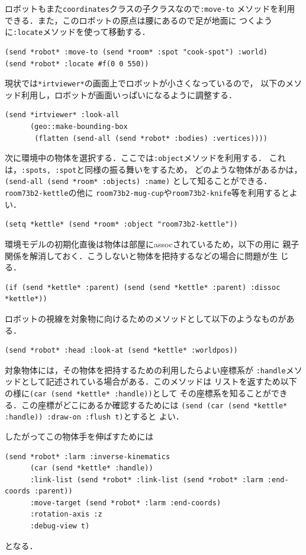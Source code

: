 ロボットもまた\verb|coordinates|クラスの子クラスなので\verb|:move-to|
メソッドを利用できる．また，このロボットの原点は腰にあるので足が地面に
つくように\verb|:locate|メソッドを使って移動する．
{\baselineskip=10pt
\begin{verbatim}
(send *robot* :move-to (send *room* :spot "cook-spot") :world)
(send *robot* :locate #f(0 0 550))
\end{verbatim}
}

現状では\verb|*irtviewer*|の画面上でロボットが小さくなっているので，
以下のメソッド利用し，ロボットが画面いっぱいになるように調整する．
{\baselineskip=10pt
\begin{verbatim}
(send *irtviewer* :look-all
      (geo::make-bounding-box
       (flatten (send-all (send *robot* :bodies) :vertices))))
\end{verbatim}
}

次に環境中の物体を選択する．ここでは\verb|:object|メソッドを利用する．
これは，\verb|:spots, :spot|と同様の振る舞いをするため，
どのような物体があるかは，\verb|(send-all (send *room* :objects) :name)|
として知ることができる．
\verb|room73b2-kettle|の他に
\verb|room73b2-mug-cup|や\verb|room73b2-knife|等を利用するとよい．

{\baselineskip=10pt
\begin{verbatim}
(setq *kettle* (send *room* :object "room73b2-kettle"))
\end{verbatim}
}

環境モデルの初期化直後は物体は部屋にassocされているため，以下の用に
親子関係を解消しておく．こうしないと物体を把持するなどの場合に問題が生
じる．
{\baselineskip=10pt
\begin{verbatim}
(if (send *kettle* :parent) (send (send *kettle* :parent) :dissoc *kettle*))
\end{verbatim}
}

ロボットの視線を対象物に向けるためのメソッドとして以下のようなものがあ
る．
{\baselineskip=10pt
\begin{verbatim}
(send *robot* :head :look-at (send *kettle* :worldpos))
\end{verbatim}
}

対象物体には，その物体を把持するための利用したらよい座標系が
\verb|:handle|メソッドとして記述されている場合がある．このメソッドは
リストを返すため以下の様に\verb|(car (send *kettle* :handle))|として
その座標系を知ることができる．この座標がどこにあるか確認するためには
\verb|(send (car (send *kettle* :handle)) :draw-on :flush t)|とすると
よい．

したがってこの物体手を伸ばすためには
{\baselineskip=10pt
\begin{verbatim}
(send *robot* :larm :inverse-kinematics
      (car (send *kettle* :handle))
      :link-list (send *robot* :link-list (send *robot* :larm :end-coords :parent))
      :move-target (send *robot* :larm :end-coords)
      :rotation-axis :z
      :debug-view t)
\end{verbatim}
}
となる．

